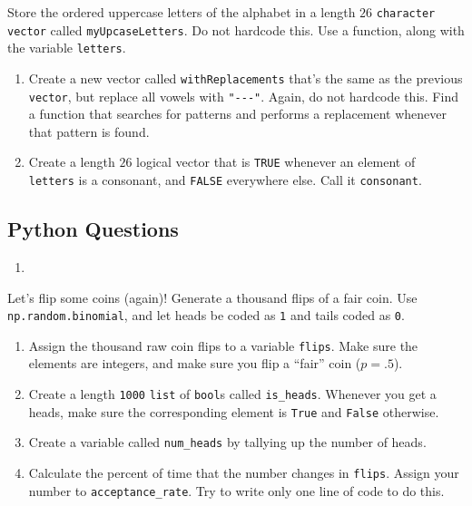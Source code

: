 \documentclass[12pt,krantz2]{krantz}
\providecommand{\tightlist}{%
  \setlength{\itemsep}{0pt}\setlength{\parskip}{0pt}}
\begin{document}
Store the ordered uppercase letters of the alphabet in a length \(26\) \texttt{character} \texttt{vector} called \texttt{myUpcaseLetters}. Do not hardcode this. Use a function, along with the variable \texttt{letters}.

\begin{enumerate}
\def\labelenumi{\alph{enumi})}
\item
  Create a new vector called \texttt{withReplacements} that's the same as the previous \texttt{vector}, but replace all vowels with \texttt{"-\/-\/-"}. Again, do not hardcode this. Find a function that searches for patterns and performs a replacement whenever that pattern is found.
\item
  Create a length \(26\) logical vector that is \texttt{TRUE} whenever an element of \texttt{letters} is a consonant, and \texttt{FALSE} everywhere else. Call it \texttt{consonant}.
\end{enumerate}

\hypertarget{python-questions-1}{%
\subsection{Python Questions}\label{python-questions-1}}

\begin{enumerate}
\def\labelenumi{\arabic{enumi}.}
\item
\end{enumerate}

Let's flip some coins (again)! Generate a thousand flips of a fair coin. Use \texttt{np.random.binomial}, and let heads be coded as \texttt{1} and tails coded as \texttt{0}.

\begin{enumerate}
\def\labelenumi{\alph{enumi})}
\tightlist
\item
  Assign the thousand raw coin flips to a variable \texttt{flips}. Make sure the elements are integers, and make sure you flip a ``fair'' coin (\(p=.5\)).
\item
  Create a length \texttt{1000} \texttt{list} of \texttt{bool}s called \texttt{is\_heads}. Whenever you get a heads, make sure the corresponding element is \texttt{True} and \texttt{False} otherwise.
\item
  Create a variable called \texttt{num\_heads} by tallying up the number of heads.
\item
  Calculate the percent of time that the number changes in \texttt{flips}. Assign your number to \texttt{acceptance\_rate}. Try to write only one line of code to do this.
\end{enumerate}
\end{document}
